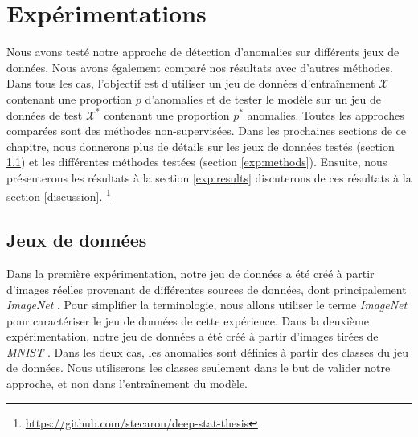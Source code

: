 \chapter{Expérimentations}     %
\label{chap:experiments}                   %

Nous avons testé notre approche de détection d'anomalies sur différents jeux de données. Nous avons également comparé nos résultats avec d'autres méthodes. Dans tous les cas, l'objectif est d'utiliser un jeu de données d'entraînement $\mathcal{X}$ contenant une proportion $p$ d'anomalies et de tester le modèle sur un jeu de données de test $\mathcal{X^*}$ contenant une proportion $p^*$ anomalies. Toutes les approches comparées sont des méthodes non-supervisées. Dans les prochaines sections de ce chapitre, nous donnerons plus de détails sur les jeux de données testés (section \DIFdelbegin \DIFdel{)}\DIFdelend \ref{exp:datasets}) et les différentes méthodes testées (section \ref{exp:methods}). Ensuite, nous présenterons les résultats à la section \ref{exp:results} \DIFdelbegin {}\DIFdelend \DIFaddbegin {}\DIFaddend discuterons de ces résultats à la section \ref{discussion}. \DIFaddbegin {}\footnote{\url{https://github.com/stecaron/deep-stat-thesis}} \DIFaddend 

\section{Jeux de données} \label{exp:datasets}

Dans la première expérimentation, notre jeu de données a été créé à partir d'images réelles provenant de différentes sources de données, dont principalement \textit{ImageNet} \citep{deng2009imagenet}. Pour simplifier la terminologie, nous allons utiliser le terme \textit{ImageNet} pour caractériser le jeu de données de cette expérience. Dans la deuxième expérimentation, notre jeu de données a été créé à partir d'images tirées de \textit{MNIST} \citep{lecun2010mnist}. Dans les deux cas, les anomalies sont définies à partir des classes du jeu de données. Nous utiliserons les classes seulement dans le but de valider notre approche, et non dans l'entraînement du modèle.


